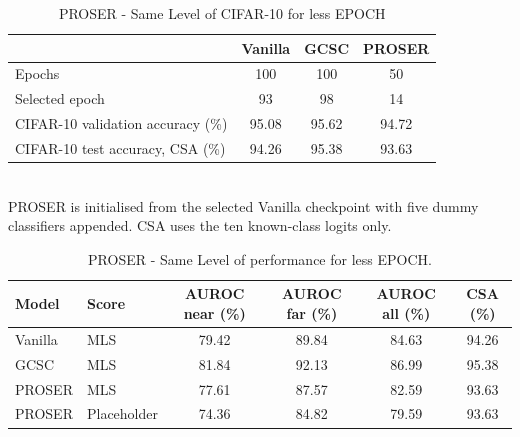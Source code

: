 \documentclass{article}
\begin{document}
\begin{table}[H]
  \caption{PROSER - Same Level of CIFAR-10 for less EPOCH}
  \label{tab:proser-closed-set}
  \centering
  \begin{tabular}{lccc}
    \toprule
    & Vanilla & GCSC & PROSER \\
    \midrule
    Epochs                            & 100   & 100   & 50    \\
    Selected epoch                    & 93    & 98    & 14    \\
    CIFAR-10 validation accuracy (\%) & 95.08 & 95.62 & 94.72 \\
    CIFAR-10 test accuracy, CSA (\%)  & 94.26 & 95.38 & 93.63 \\
    \bottomrule
  \end{tabular}
  \\[2pt]
  \footnotesize PROSER is initialised from the selected Vanilla checkpoint with five dummy
  classifiers appended. CSA uses the ten known-class logits only.
\end{table}

\begin{table}[H]
  \caption{PROSER - Same Level of performance for less EPOCH.}
  \label{tab:proser-auroc}
  \centering
  \begin{tabular}{llcccc}
    \toprule
    Model & Score & AUROC near (\%) & AUROC far (\%) & AUROC all (\%) & CSA (\%) \\
    \midrule
    Vanilla & MLS         & 79.42 & 89.84 & 84.63 & 94.26 \\
    GCSC    & MLS         & 81.84 & 92.13 & 86.99 & 95.38 \\
    PROSER  & MLS         & 77.61 & 87.57 & 82.59 & 93.63 \\
    PROSER  & Placeholder & 74.36 & 84.82 & 79.59 & 93.63 \\
    \bottomrule
  \end{tabular}
\end{table}
\end{document}
